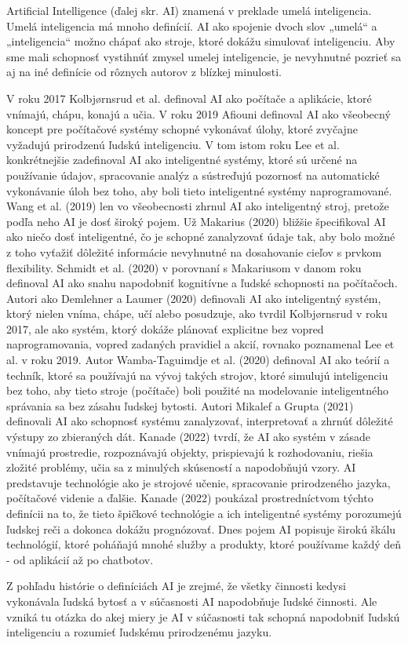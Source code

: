 Artificial Intelligence (ďalej skr. AI) znamená v preklade umelá inteligencia. Umelá inteligencia má mnoho definícií. AI ako spojenie dvoch slov „umelá“ a „inteligencia“ možno chápať ako stroje, ktoré dokážu simulovať inteligenciu. \cite{1article} Aby sme mali schopnosť vystihnúť zmysel umelej inteligencie, je nevyhnutné pozrieť sa aj na iné definície od rôznych autorov z blízkej minulosti.
\par V roku 2017 Kolbjørnsrud et al. definoval AI ako počítače a aplikácie, ktoré vnímajú, chápu, konajú a učia. \cite{2article} V roku 2019 Afiouni definoval AI ako všeobecný koncept pre počítačové systémy schopné vykonávať úlohy, ktoré zvyčajne vyžadujú prirodzenú ľudskú inteligenciu. \cite{3conference} V tom istom roku  Lee et al. konkrétnejšie zadefinoval AI ako inteligentné systémy, ktoré sú určené na používanie údajov, spracovanie analýz a sústreďujú pozornosť na automatické vykonávanie úloh bez toho, aby boli tieto inteligentné systémy naprogramované.\cite{4article} Wang et al. (2019) len vo všeobecnosti zhrnul AI ako inteligentný stroj, pretože podľa neho AI je dosť široký pojem. Už Makarius (2020) bližšie špecifikoval AI ako niečo dosť inteligentné, čo je schopné zanalyzovať údaje tak, aby bolo možné z toho vyťažiť dôležité informácie nevyhnutné na dosahovanie cieľov s prvkom flexibility. Schmidt et al. (2020) v porovnaní s Makariusom v danom roku definoval AI ako snahu napodobniť kognitívne a ľudské schopnosti na počítačoch. \cite{5article} Autori ako Demlehner a Laumer (2020) definovali AI ako inteligentný systém, ktorý nielen vníma, chápe, učí alebo posudzuje, ako tvrdil Kolbjørnsrud v roku 2017, ale ako systém, ktorý dokáže plánovať explicitne bez vopred naprogramovania, vopred zadaných pravidiel a akcií, rovnako poznamenal Lee et al. v roku 2019. Autor Wamba-Taguimdje et al. (2020) definoval AI ako teórií a techník, ktoré sa používajú na vývoj takých strojov, ktoré simulujú inteligenciu bez toho, aby tieto stroje (počítače) boli použité na modelovanie inteligentného správania sa bez zásahu ľudskej bytosti. Autori Mikalef a Grupta (2021) definovali AI ako schopnosť systému zanalyzovať, interpretovať a zhrnúť dôležité výstupy zo zbieraných dát. Kanade (2022) tvrdí, že AI ako systém v zásade vnímajú prostredie, rozpoznávajú objekty, prispievajú k rozhodovaniu, riešia zložité problémy, učia sa z minulých skúseností a napodobňujú vzory. \cite{6article}AI predstavuje technológie ako je strojové učenie, spracovanie prirodzeného jazyka, počítačové videnie a ďalšie. Kanade (2022) poukázal prostredníctvom týchto definícii na to, že tieto špičkové technológie a ich inteligentné systémy porozumejú ľudskej reči a dokonca dokážu prognózovať. Dnes pojem AI popisuje širokú škálu technológií, ktoré poháňajú mnohé služby a produkty, ktoré používame každý deň - od aplikácií až po chatbotov. \cite{7article}
\par Z pohľadu histórie o definíciách AI je zrejmé, že všetky činnosti kedysi vykonávala ľudská bytosť a v súčasnosti AI napodobňuje ľudské činnosti. Ale vzniká tu otázka do akej miery je AI v súčasnosti tak schopná napodobniť ľudskú inteligenciu a rozumieť ľudskému prirodzenému jazyku.


